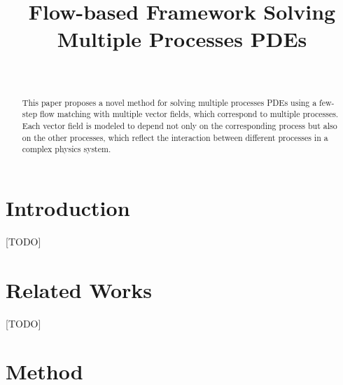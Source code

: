 \documentclass{article}
\title{Flow-based Framework Solving Multiple Processes PDEs}
\author{%
   \\
}
\begin{document}
\maketitle


\begin{abstract}
  This paper proposes a novel method for solving multiple processes PDEs using a few-step flow matching with multiple vector fields, which correspond to multiple processes. Each vector field is modeled to depend not only on the corresponding process but also on the other processes, which reflect the interaction between different processes in a complex physics system.
\end{abstract}



\section{Introduction}
[TODO]
\section{Related Works}
[TODO]
\section{Method}
\label{sec:method}
\end{document}
